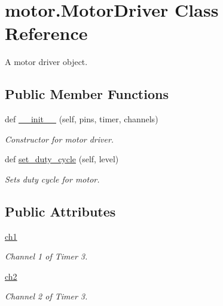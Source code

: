 \hypertarget{classmotor_1_1MotorDriver}{}\section{motor.\+Motor\+Driver Class Reference}
\label{classmotor_1_1MotorDriver}


A motor driver object.  


\subsection*{Public Member Functions}
\begin{DoxyCompactItemize}
\item 
def \mbox{\hyperlink{classmotor_1_1MotorDriver_a21feb0e2236f52901780b84a989008d1}{\+\_\+\+\_\+init\+\_\+\+\_\+}} (self, pins, timer, channels)
\begin{DoxyCompactList}\small\item\em Constructor for motor driver. \end{DoxyCompactList}\item 
def \mbox{\hyperlink{classmotor_1_1MotorDriver_a51b4721406aa66e0807413199b8b700f}{set\+\_\+duty\+\_\+cycle}} (self, level)
\begin{DoxyCompactList}\small\item\em Sets duty cycle for motor. \end{DoxyCompactList}\end{DoxyCompactItemize}
\subsection*{Public Attributes}
\begin{DoxyCompactItemize}
\item 
\mbox{\label{classmotor_1_1MotorDriver_ab59ff180f9593d716a60d0177cd8564e}} 
\mbox{\hyperlink{classmotor_1_1MotorDriver_ab59ff180f9593d716a60d0177cd8564e}{ch1}}
\begin{DoxyCompactList}\small\item\em Channel 1 of Timer 3. \end{DoxyCompactList}\item 
\mbox{\label{classmotor_1_1MotorDriver_af47581f527f4163d62810c617e081001}} 
\mbox{\hyperlink{classmotor_1_1MotorDriver_af47581f527f4163d62810c617e081001}{ch2}}
\begin{DoxyCompactList}\small\item\em Channel 2 of Timer 3. \end{DoxyCompactList}\end{DoxyCompactItemize}


